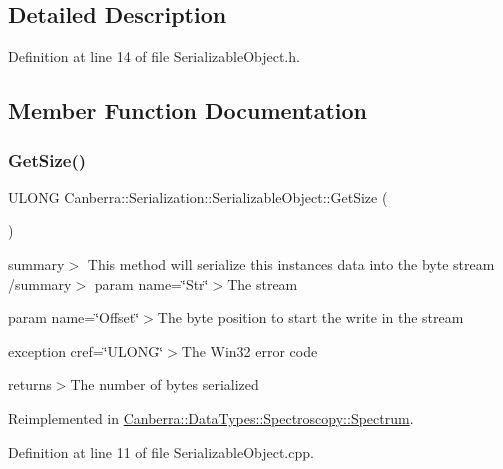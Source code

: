 \subsection{Detailed Description}


Definition at line 14 of file Serializable\+Object.\+h.



\subsection{Member Function Documentation}
\mbox{\label{class_canberra_1_1_serialization_1_1_serializable_object_a1af5a56d77422d2d6f56d1fb8bc9f376_a1af5a56d77422d2d6f56d1fb8bc9f376}} 
\subsubsection{\texorpdfstring{Get\+Size()}{GetSize()}}
{\footnotesize\ttfamily U\+L\+O\+NG Canberra\+::\+Serialization\+::\+Serializable\+Object\+::\+Get\+Size (\begin{DoxyParamCaption}{ }\end{DoxyParamCaption})\hspace{0.3cm}{\ttfamily [virtual]}}

summary$>$ This method will serialize this instances data into the byte stream /summary$>$ param name=\char`\"{}\+Str\char`\"{}$>$The stream

param name=\char`\"{}\+Offset\char`\"{}$>$The byte position to start the write in the stream

exception cref=\char`\"{}\+U\+L\+O\+N\+G\char`\"{}$>$The Win32 error code

returns$>$The number of bytes serialized

Reimplemented in \hyperlink{class_canberra_1_1_data_types_1_1_spectroscopy_1_1_spectrum_a95b9306d8163e99c546cbae2afe59785_a95b9306d8163e99c546cbae2afe59785}{Canberra\+::\+Data\+Types\+::\+Spectroscopy\+::\+Spectrum}.



Definition at line 11 of file Serializable\+Object.\+cpp.

